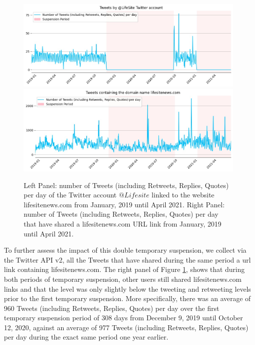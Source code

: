 \documentclass{article}
\begin{document}
\begin{figure}[h]
\hspace{-2em}
		\includegraphics[scale=0.32]{../figure/lifesite_updated_legend.jpg} 
		\includegraphics[scale=0.32]{../figure/lifesite_domain_updated_legend.jpg}
\caption{Left Panel: number of Tweets (including Retweets, Replies, Quotes) per day of the Twitter account $@Lifesite$ linked to the website lifesitenews.com from January, 2019 until April 2021. Right Panel: number of Tweets (including Retweets, Replies, Quotes) per day that have shared a lifesitenews.com URL link from January, 2019 until April 2021. }
\label{fig2}
\end{figure}

To further assess the impact of this double temporary suspension, we collect via the Twitter API v2, all the Tweets that have shared during the same period a url link containing lifesitenews.com. The right panel of Figure \ref{fig2}, shows that during both periods of temporary suspension, other users still shared lifesitenews.com links and that the level was only slightly below the tweeting and retweeting levels prior to the first temporary suspension. More specifically, there was an average of 960 Tweets (including Retweets, Replies, Quotes) per day over the first temporary suspension period of 308 days from December 9, 2019 until October 12, 2020, against an average of 977 Tweets (including Retweets, Replies, Quotes) per day during the exact same period one year earlier. 
\end{document}
